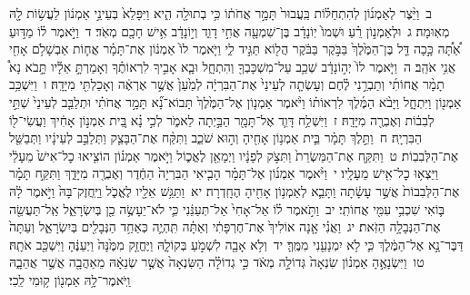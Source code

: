 \documentclass[18pt]{article}
\newcommand{\kri}[1]{\Afootnote{#1}}	%
\begin{document}
 {\loc ב~}וַיֵּ֨צֶר לְאַמְנ֜וֹן לְהִתְחַלּ֗וֹת בַּֽעֲבוּר֙ תָּמָ֣ר אֲחֹת֔וֹ כִּ֥י בְתוּלָ֖ה הִ֑יא וַיִּפָּלֵא֙ בְּעֵינֵ֣י אַמְנ֔וֹן לַעֲשׂ֥וֹת לָ֖הּ מְאֽוּמָה׃ \startlock
 {\loc ג~}וּלְאַמְנ֣וֹן רֵ֗עַ וּשְׁמוֹ֙ יֽוֹנָדָ֔ב בֶּן־שִׁמְעָ֖ה אֲחִ֣י דָוִ֑ד וְי֣וֹנָדָ֔ב אִ֥ישׁ חָכָ֖ם מְאֹֽד׃ \startlock
 {\loc ד~}וַיֹּ֣אמֶר ל֗וֹ מַדּ֣וּעַ אַ֠תָּ֠ה כָּ֣כָה דַּ֤ל בֶּן־הַמֶּ֙לֶךְ֙ בַּבֹּ֣קֶר בַּבֹּ֔קֶר הֲל֖וֹא תַּגִּ֣יד לִ֑י וַיֹּ֤אמֶר לוֹ֙ אַמְנ֔וֹן אֶת־תָּמָ֗ר אֲח֛וֹת אַבְשָׁלֹ֥ם אָחִ֖י אֲנִ֥י אֹהֵֽב׃ \startlock
 {\loc ה~}וַיֹּ֤אמֶר לוֹ֙ יְה֣וֹנָדָ֔ב שְׁכַ֥ב עַל־מִשְׁכָּבְךָ֖ וְהִתְחָ֑ל וּבָ֧א אָבִ֣יךָ לִרְאוֹתֶ֗ךָ וְאָמַרְתָּ֣ אֵלָ֡יו תָּ֣בֹא נָא֩ תָמָ֨ר אֲחוֹתִ֜י וְתַבְרֵ֣נִי לֶ֗חֶם וְעָשְׂתָ֤ה לְעֵינַי֙ אֶת־הַבִּרְיָ֔ה לְמַ֙עַן֙ אֲשֶׁ֣ר אֶרְאֶ֔ה וְאָכַלְתִּ֖י מִיָּדָֽהּ׃ \startlock
 {\loc ו~}וַיִּשְׁכַּ֥ב אַמְנ֖וֹן וַיִּתְחָ֑ל וַיָּבֹ֨א הַמֶּ֜לֶךְ לִרְאוֹת֗וֹ וַיֹּ֨אמֶר אַמְנ֤וֹן אֶל־הַמֶּ֙לֶךְ֙ תָּבוֹא־נָ֞א תָּמָ֣ר אֲחֹתִ֗י וּתְלַבֵּ֤ב לְעֵינַי֙ שְׁתֵּ֣י לְבִב֔וֹת וְאֶבְרֶ֖ה מִיָּדָֽהּ׃ \startlock
 {\loc ז~}וַיִּשְׁלַ֥ח דָּוִ֛ד אֶל־תָּמָ֖ר הַבַּ֣יְתָה לֵאמֹ֑ר לְכִ֣י נָ֗א בֵּ֚ית אַמְנ֣וֹן אָחִ֔יךְ וַעֲשִׂי־ל֖וֹ הַבִּרְיָֽה׃ \startlock
 {\loc ח~}וַתֵּ֣לֶךְ תָּמָ֗ר בֵּ֛ית אַמְנ֥וֹן אָחִ֖יהָ וְה֣וּא שֹׁכֵ֑ב וַתִּקַּ֨ח אֶת־הַבָּצֵ֤ק  \edtext{(ותלוש)}{\kri{קרי: וַתָּ֙לׇשׁ֙}}  וַתְּלַבֵּ֣ב לְעֵינָ֔יו וַתְּבַשֵּׁ֖ל אֶת־הַלְּבִבֽוֹת׃ \startlock
 {\loc ט~}וַתִּקַּ֤ח אֶת־הַמַּשְׂרֵת֙ וַתִּצֹ֣ק לְפָנָ֔יו וַיְמָאֵ֖ן לֶאֱכ֑וֹל וַיֹּ֣אמֶר אַמְנ֗וֹן הוֹצִ֤יאוּ כׇל־אִישׁ֙ מֵעָלַ֔י וַיֵּצְא֥וּ כׇל־אִ֖ישׁ מֵעָלָֽיו׃ \startlock
 {\loc י~}וַיֹּ֨אמֶר אַמְנ֜וֹן אֶל־תָּמָ֗ר הָבִ֤יאִי הַבִּרְיָה֙ הַחֶ֔דֶר וְאֶבְרֶ֖ה מִיָּדֵ֑ךְ וַתִּקַּ֣ח תָּמָ֗ר אֶת־הַלְּבִבוֹת֙ אֲשֶׁ֣ר עָשָׂ֔תָה וַתָּבֵ֛א לְאַמְנ֥וֹן אָחִ֖יהָ הֶחָֽדְרָה׃ \startlock
 {\loc יא~}וַתַּגֵּ֥שׁ אֵלָ֖יו לֶאֱכֹ֑ל וַיַּֽחֲזֶק־בָּהּ֙ וַיֹּ֣אמֶר לָ֔הּ בּ֛וֹאִי שִׁכְבִ֥י עִמִּ֖י אֲחוֹתִֽי׃ \startlock
 {\loc יב~}וַתֹּ֣אמֶר ל֗וֹ אַל־אָחִי֙ אַל־תְּעַנֵּ֔נִי כִּ֛י לֹא־יֵעָשֶׂ֥ה כֵ֖ן בְּיִשְׂרָאֵ֑ל אַֽל־תַּעֲשֵׂ֖ה אֶת־הַנְּבָלָ֥ה הַזֹּֽאת׃ \startlock
 {\loc יג~}וַאֲנִ֗י אָ֤נָה אוֹלִיךְ֙ אֶת־חֶרְפָּתִ֔י וְאַתָּ֗ה תִּֽהְיֶ֛ה כְּאַחַ֥ד הַנְּבָלִ֖ים בְּיִשְׂרָאֵ֑ל וְעַתָּה֙ דַּבֶּר־נָ֣א אֶל־הַמֶּ֔לֶךְ כִּ֛י לֹ֥א יִמְנָעֵ֖נִי מִמֶּֽךָּ׃ \startlock
 {\loc יד~}וְלֹ֥א אָבָ֖ה לִשְׁמֹ֣עַ בְּקוֹלָ֑הּ וַיֶּחֱזַ֤ק מִמֶּ֙נָּה֙ וַיְעַנֶּ֔הָ וַיִּשְׁכַּ֖ב אֹתָֽהּ׃ \startlock
 {\loc טו~}וַיִּשְׂנָאֶ֣הָ אַמְנ֗וֹן שִׂנְאָה֙ גְּדוֹלָ֣ה מְאֹ֔ד כִּ֣י גְדוֹלָ֗ה הַשִּׂנְאָה֙ אֲשֶׁ֣ר שְׂנֵאָ֔הּ מֵאַהֲבָ֖ה אֲשֶׁ֣ר אֲהֵבָ֑הּ וַֽיֹּאמֶר־לָ֥הּ אַמְנ֖וֹן ק֥וּמִי לֵֽכִי׃ \startlock
\end{document}
